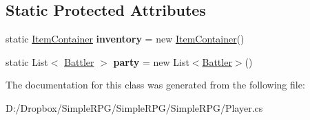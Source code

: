 \subsection*{Static Protected Attributes}
\begin{DoxyCompactItemize}
\item 
\hypertarget{class_simple_r_p_g_1_1_player_a64192a3f860c47d7a67fc885dbb8ffcd}{static \hyperlink{class_simple_r_p_g_1_1_item_container}{Item\+Container} {\bfseries inventory} = new \hyperlink{class_simple_r_p_g_1_1_item_container}{Item\+Container}()}\label{class_simple_r_p_g_1_1_player_a64192a3f860c47d7a67fc885dbb8ffcd}

\item 
\hypertarget{class_simple_r_p_g_1_1_player_a254855437c04bc8cbc74d63225b05bfe}{static List$<$ \hyperlink{class_simple_r_p_g_1_1_battler}{Battler} $>$ {\bfseries party} = new List$<$\hyperlink{class_simple_r_p_g_1_1_battler}{Battler}$>$()}\label{class_simple_r_p_g_1_1_player_a254855437c04bc8cbc74d63225b05bfe}

\end{DoxyCompactItemize}


The documentation for this class was generated from the following file\+:\begin{DoxyCompactItemize}
\item 
D\+:/\+Dropbox/\+Simple\+R\+P\+G/\+Simple\+R\+P\+G/\+Simple\+R\+P\+G/Player.\+cs\end{DoxyCompactItemize}

